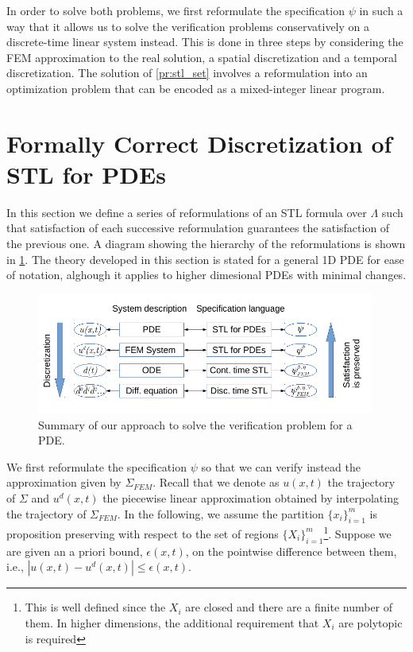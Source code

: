 \documentclass[oribibl]{llncs/llncs}
\begin{document}
In order to solve both problems, we first reformulate the specification $\psi$
in such a way that it allows us to solve the verification problems
conservatively on a discrete-time linear system instead. This is done in three
steps by considering the FEM approximation to the real solution, a spatial
discretization and a temporal discretization. The solution of \cref{pr:stl_set}
involves a reformulation into an optimization problem that can be encoded as a
mixed-integer linear program.

\section{Formally Correct Discretization of STL for PDEs}
\label{sec:formally_correct_discretization_of_pdestl}

In this section we define a series of reformulations of an STL formula over
$\Lambda$ such that satisfaction of each successive reformulation guarantees the
satisfaction of the previous one. A diagram showing the hierarchy of the
reformulations is shown in \cref{fig:diagram}. The theory developed in this section is stated
for a general 1D PDE for ease of notation, alghough it applies to higher dimesional PDEs
with minimal changes.

\begin{figure}[!t]
    \centering 
        \includegraphics[width=0.99\textwidth]{diagram.png}
    \caption{Summary of our approach to solve the verification problem for a
    PDE.}
    \label{fig:diagram}
\end{figure}


We first reformulate the specification $\psi$ so that we can verify instead the
approximation given by $\Sigma_{FEM}$. Recall that we denote as $u(x,t)$ the
trajectory of $\Sigma$ and $u^d(x, t)$ the piecewise linear approximation
obtained by interpolating the trajectory of $\Sigma_{FEM}$. In the following, we
assume the partition $\{x_i\}_{i=1}^m$ is proposition preserving with respect 
to the set of
regions $\{X_i\}_{i = 1}^{m}$\footnote{This is well defined since the $X_i$ are
closed and there are a finite number of them. In higher dimensions, the
additional requirement that $X_i$ are polytopic is required}. Suppose we are given
an a priori bound, $\epsilon(x, t)$, on the pointwise difference between them, i.e., 
$|u(x, t) - u^d(x, t)| \leq \epsilon(x, t)$.
\end{document}

